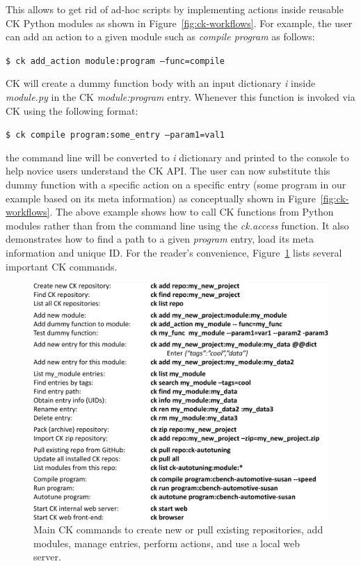 This allows to get rid of ad-hoc scripts by implementing actions inside
reusable CK Python modules as shown in Figure~\ref{fig:ck-workflows}.
%
For example, the user can add an action to a given module such as \textit{compile program}
as follows:
\begin{flushleft}
\texttt{\$ ck add\_action module:program --func=compile}
\end{flushleft}
%
CK will create a dummy function body with an input dictionary \textit{i}
inside \textit{module.py} in the CK \textit{module:program} entry.
%
Whenever this function is invoked via CK using the following format:
\begin{flushleft}
\texttt{\$ ck compile program:some\_entry --param1=val1}
\end{flushleft}
the command line will be converted to \textit{i} dictionary
and printed to the console to help novice users understand the CK API.
%
The user can now substitute this dummy function with a specific action on a specific entry
(some program in our example based on its meta information)
as conceptually shown in Figure~\ref{fig:ck-workflows}.
%
The above example shows how to call CK functions from Python modules rather than from the command line
using the \textit{ck.access} function.
%
It also demonstrates how to find a path to a given \textit{program} entry,
load its meta information and unique ID.
%
For the reader's convenience, Figure~\ref{fig:ck-commands} lists several important CK commands.

   \begin{figure}[htbp]
     \centering
      \includegraphics[width=4.8in]
      {ck-assets/ef7349a78679ca71-cropped.pdf} %
     \caption{
        Main CK commands to create new or pull existing repositories, add modules, manage entries, perform actions, and use a local web server.
     }
     \label{fig:ck-commands}
   \end{figure}

